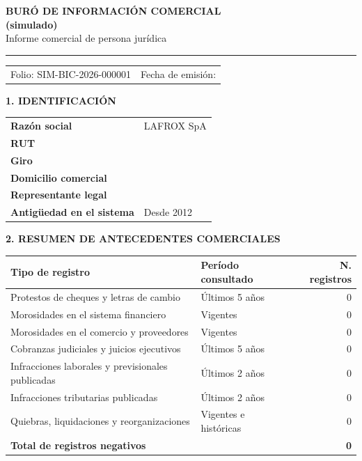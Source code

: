 \documentclass[11pt]{article}
\newcommand{\campo}[2]{\textbf{#1} & #2\\}
\newcommand{\banda}[1]{\par\medskip\noindent\colorbox{SIMclaro}{\parbox{\dimexpr\linewidth-2\fboxsep}{\bfseries\small #1}}\par\smallskip}
\begin{document}
\noindent\begin{minipage}[c]{0.62\linewidth}
  {\Large\bfseries BURÓ DE INFORMACIÓN COMERCIAL}\\[1pt]
  {\bfseries (simulado)}\\[2pt]
  {\small Informe comercial de persona jurídica}
\end{minipage}\hfill
\begin{minipage}[c]{3.2cm}\raggedleft{}\end{minipage}

\vspace{2pt}\noindent\rule{\linewidth}{1pt}
\noindent\begin{tabularx}{\linewidth}{@{}X X@{}}
  \small Folio: SIM-BIC-2026-000001 & \small\raggedleft Fecha de emisión: \SIMfechacorta{} \\
\end{tabularx}


\banda{1. IDENTIFICACIÓN}
\noindent\begin{tabularx}{\linewidth}{@{}l X@{}}
  \campo{Razón social}{LAFROX SpA}
  \campo{RUT}{\LFXrut}
  \campo{Giro}{\SIMgiro}
  \campo{Domicilio comercial}{\LFXdomicilio}
  \campo{Representante legal}{\LFXrepresentante}
  \campo{Antigüedad en el sistema}{Desde 2012}
\end{tabularx}

\banda{2. RESUMEN DE ANTECEDENTES COMERCIALES}
\noindent\begin{tabularx}{\linewidth}{@{}X l r@{}}\toprule
  \textbf{Tipo de registro} & \textbf{Período consultado} & \textbf{N.\textdegree{} registros}\\\midrule
  Protestos de cheques y letras de cambio & Últimos 5 años & 0\\
  Morosidades en el sistema financiero & Vigentes & 0\\
  Morosidades en el comercio y proveedores & Vigentes & 0\\
  Cobranzas judiciales y juicios ejecutivos & Últimos 5 años & 0\\
  Infracciones laborales y previsionales publicadas & Últimos 2 años & 0\\
  Infracciones tributarias publicadas & Últimos 2 años & 0\\
  Quiebras, liquidaciones y reorganizaciones & Vigentes e históricas & 0\\\midrule
  \textbf{Total de registros negativos} & & \textbf{0}\\\bottomrule
\end{tabularx}
\end{document}
